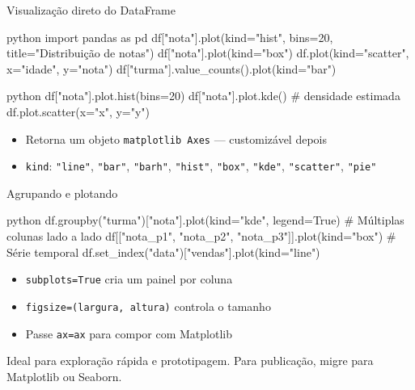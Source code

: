 \documentclass[xcolor=dvipsnames,t,aspectratio=169]{beamer}
\begin{document}
\begin{frame}[c, fragile]{Visualização direto do DataFrame}

\begin{code}{python}
import pandas as pd
df["nota"].plot(kind="hist", bins=20, title="Distribuição de notas")
df["nota"].plot(kind="box")
df.plot(kind="scatter", x="idade", y="nota")
df["turma"].value_counts().plot(kind="bar")
\end{code}

\begin{code}{python}
df["nota"].plot.hist(bins=20)
df["nota"].plot.kde()          # densidade estimada
df.plot.scatter(x="x", y="y")
\end{code}

\begin{itemize}
    \item Retorna um objeto \texttt{matplotlib Axes} — customizável depois
    \item \texttt{kind}: \texttt{"line"}, \texttt{"bar"}, \texttt{"barh"}, \texttt{"hist"}, \texttt{"box"}, \texttt{"kde"}, \texttt{"scatter"}, \texttt{"pie"}
\end{itemize}

\end{frame}


\begin{frame}[c, fragile]{Agrupando e plotando}

\begin{code}{python}
df.groupby("turma")["nota"].plot(kind="kde", legend=True)
# Múltiplas colunas lado a lado
df[["nota_p1", "nota_p2", "nota_p3"]].plot(kind="box")
# Série temporal
df.set_index("data")["vendas"].plot(kind="line")
\end{code}

\begin{itemize}
    \item \texttt{subplots=True} cria um painel por coluna
    \item \texttt{figsize=(largura, altura)} controla o tamanho
    \item Passe \texttt{ax=ax} para compor com Matplotlib
\end{itemize}

\begin{display}
Ideal para exploração rápida e prototipagem. Para publicação, migre para Matplotlib ou Seaborn.
\end{display}

\end{frame}
\end{document}
